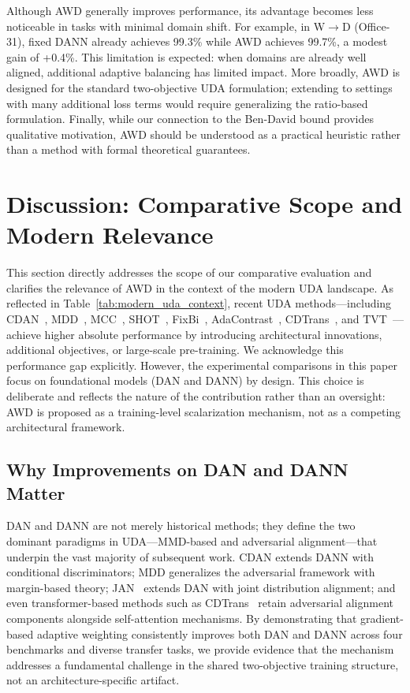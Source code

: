 \documentclass[pdflatex,sn-mathphys-num]{sn-jnl}
\theoremstyle{thmstyleone}
\theoremstyle{thmstyletwo}
\theoremstyle{thmstylethree}
\begin{document}
Although AWD generally improves performance, its advantage becomes less noticeable in tasks with minimal domain shift.
For example, in W$\to$D (Office-31), fixed DANN already achieves 99.3\% while AWD achieves 99.7\%, a modest gain of +0.4\%.
This limitation is expected: when domains are already well aligned, additional adaptive balancing has limited impact.
More broadly, AWD is designed for the standard two-objective UDA formulation; extending to settings with many additional loss terms would require generalizing the ratio-based formulation.
Finally, while our connection to the Ben-David bound provides qualitative motivation, AWD should be understood as a practical heuristic rather than a method with formal theoretical guarantees.


\section{Discussion: Comparative Scope and Modern Relevance}
\label{sec:discussion}

This section directly addresses the scope of our comparative evaluation and clarifies the relevance of AWD in the context of the modern UDA landscape. As reflected in Table~\ref{tab:modern_uda_context}, recent UDA methods—including CDAN~\cite{long2018cdan}, MDD~\cite{zhang2019mdd}, MCC~\cite{jin2020mcc}, SHOT~\cite{liang2020shot}, FixBi~\cite{na2021fixbi}, AdaContrast~\cite{chen2022contrastive}, CDTrans~\cite{xu2022cdtrans}, and TVT~\cite{yang2023tvt}—achieve higher absolute performance by introducing architectural innovations, additional objectives, or large-scale pre-training. We acknowledge this performance gap explicitly. However, the experimental comparisons in this paper focus on foundational models (DAN and DANN) by design. This choice is deliberate and reflects the nature of the contribution rather than an oversight: AWD is proposed as a training-level scalarization mechanism, not as a competing architectural framework.


\subsection{Why Improvements on DAN and DANN Matter}

DAN and DANN are not merely historical methods; they define the two dominant paradigms in UDA---MMD-based and adversarial alignment---that underpin the vast majority of subsequent work. CDAN extends DANN with conditional discriminators; MDD generalizes the adversarial framework with margin-based theory; JAN~\cite{long2017jan} extends DAN with joint distribution alignment; and even transformer-based methods such as CDTrans~\cite{xu2022cdtrans} retain adversarial alignment components alongside self-attention mechanisms. By demonstrating that gradient-based adaptive weighting consistently improves both DAN and DANN across four benchmarks and diverse transfer tasks, we provide evidence that the mechanism addresses a fundamental challenge in the shared two-objective training structure, not an architecture-specific artifact.
\end{document}
